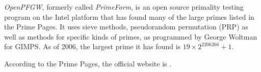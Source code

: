 \documentclass[12pt]{article}
\begin{document}
{\em OpenPFGW}, formerly called {\em PrimeForm}, is an open source primality testing program on the Intel platform that has found many of the large primes listed in the Prime Pages. It uses sieve methods, pseudorandom permutation (PRP) as well as methods for specific kinds of primes, as programmed by George Woltman for GIMPS. As of 2006, the largest prime it has found is $19 \times 2^{2206266} + 1$.

According to the Prime Pages, the official website is .

\end{document}
